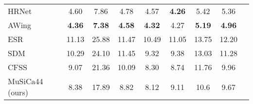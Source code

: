 \documentclass[9pt,twocolumn]{extarticle}
\begin{document}
\begin{table*}[]
\begin{tabular}{@{}lcccccccl@{}}
HRNet  \cite{sun2019high}       & 4.60                        & 7.86                                                  & 4.78                                                        & 4.57                                                          & \textbf{4.26}                                            & 5.42                                                       & 5.36                                                  & \cellcolor[HTML]{FE0000}                        \\
AWing  \cite{wang2019adaptive}       & \textbf{4.36}               & \textbf{7.38}                                         & \textbf{4.58}                                               & \textbf{4.32}                                                 & 4.27                                                     & \textbf{5.19}                                              & \textbf{4.96}                                         & \cellcolor[HTML]{FE0000}{\color[HTML]{000000} } \\ \midrule
ESR \cite{cao2014face}          & 11.13                       & 25.88                                                 & 11.47                                                       & 10.49                                                         & 11.05                                                    & 13.75                                                      & 12.20                                                 & \cellcolor[HTML]{0000FF}                        \\
SDM \cite{xiong2013supervised}  & 10.29                       & 24.10                                                 & 11.45                                                       & 9.32                                                          & 9.38                                                     & 13.03                                                      & 11.28                                                 & \cellcolor[HTML]{0000FF}                        \\
CFSS \cite{cao2014face} & 9.07                        & 21.36                                                 & 10.09                                                       & 8.30                                                          & 8.74                                                     & 11.76                                                      & 9.96                                                  & \cellcolor[HTML]{0000FF}                        \\
MuSiCa44 (ours)     & 8.38                        & 17.89                                                 & 8.82                                                        & 8.12                                                          & 9.11                                                     & 10.6                                                       & 9.67                                                  & \cellcolor[HTML]{0000FF}                        \\

\end{tabular}
\end{table*}
\end{document}
